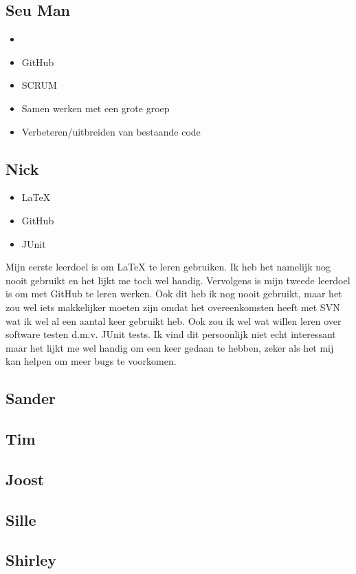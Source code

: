 \documentclass{article}
\begin{document}
\subsection*{Seu Man}
\begin{itemize}
	\item \Latex
	\item GitHub
	\item SCRUM
	\item Samen werken met een grote groep
	\item Verbeteren/uitbreiden van bestaande code
\end{itemize}

\subsection*{Nick}
\begin{itemize}
	\item \LaTeX
	\item GitHub
	\item JUnit
\end{itemize} 
Mijn eerste leerdoel is om \LaTeX{} te leren gebruiken. Ik heb het namelijk nog nooit gebruikt en het lijkt me toch wel handig. Vervolgens is mijn tweede leerdoel is om met GitHub te leren werken. Ook dit heb ik nog nooit gebruikt,  maar het zou wel iets makkelijker moeten zijn omdat het overeenkomsten heeft met SVN wat ik wel al
een aantal keer gebruikt heb. Ook zou ik wel wat willen leren over software testen d.m.v. JUnit tests. Ik vind dit persoonlijk niet echt interessant maar het lijkt me wel handig om een keer gedaan te hebben, zeker als het mij kan helpen om  meer bugs te voorkomen.

\subsection*{Sander}
\subsection*{Tim}
\subsection*{Joost}
\subsection*{Sille}
\subsection*{Shirley}
\end{document}
